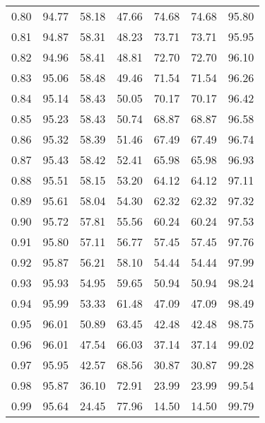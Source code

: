 \begin{tabular}{|c|c|c|c|c|c|c|}
      0.80 &     94.77 &     58.18 &      47.66 &   74.68 &      74.68 &         95.80 \\
      0.81 &     94.87 &     58.31 &      48.23 &   73.71 &      73.71 &         95.95 \\
      0.82 &     94.96 &     58.41 &      48.81 &   72.70 &      72.70 &         96.10 \\
      0.83 &     95.06 &     58.48 &      49.46 &   71.54 &      71.54 &         96.26 \\
      0.84 &     95.14 &     58.43 &      50.05 &   70.17 &      70.17 &         96.42 \\
      0.85 &     95.23 &     58.43 &      50.74 &   68.87 &      68.87 &         96.58 \\
      0.86 &     95.32 &     58.39 &      51.46 &   67.49 &      67.49 &         96.74 \\
      0.87 &     95.43 &     58.42 &      52.41 &   65.98 &      65.98 &         96.93 \\
      0.88 &     95.51 &     58.15 &      53.20 &   64.12 &      64.12 &         97.11 \\
      0.89 &     95.61 &     58.04 &      54.30 &   62.32 &      62.32 &         97.32 \\
      0.90 &     95.72 &     57.81 &      55.56 &   60.24 &      60.24 &         97.53 \\
      0.91 &     95.80 &     57.11 &      56.77 &   57.45 &      57.45 &         97.76 \\
      0.92 &     95.87 &     56.21 &      58.10 &   54.44 &      54.44 &         97.99 \\
      0.93 &     95.93 &     54.95 &      59.65 &   50.94 &      50.94 &         98.24 \\
      0.94 &     95.99 &     53.33 &      61.48 &   47.09 &      47.09 &         98.49 \\
      0.95 &     96.01 &     50.89 &      63.45 &   42.48 &      42.48 &         98.75 \\
      0.96 &     96.01 &     47.54 &      66.03 &   37.14 &      37.14 &         99.02 \\
      0.97 &     95.95 &     42.57 &      68.56 &   30.87 &      30.87 &         99.28 \\
      0.98 &     95.87 &     36.10 &      72.91 &   23.99 &      23.99 &         99.54 \\
      0.99 &     95.64 &     24.45 &      77.96 &   14.50 &      14.50 &         99.79 \\
\bottomrule
\end{tabular}
